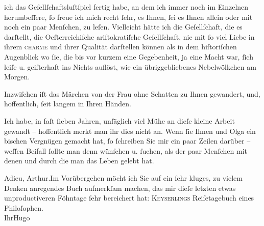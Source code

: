 \pstart
           \label{T_L02331-1v}\label{T_L02331-1}{ }{\pb}ich das Geſellſchaftsluſtſpiel fertig habe, an dem
               ich immer noch im Einzelnen herumbeſſere,{ }ſo freue ich mich recht{ }ſehr, es Ihnen,{ }ſei
               es Ihnen allein oder mit noch ein paar Menſchen, zu leſen. Vielleicht hätte ich die
               Geſellſchaft, die es darſtellt, die Oeſterreichiſche  ariſtokratiſche Geſellſchaft, nie mit{ }ſo viel Liebe in ihrem \textsc{charme} und ihrer Qualität darſtellen können als in dem
               hiſtoriſchen Augenblick wo{ }ſie, die bis vor kurzem eine Gegebenheit, ja eine Macht
               war,{ }ſich leiſe u. geiſterhaft ins Nichts auflöst, wie {\pb}ein übriggebliebenes Nebelwölkchen
               am Morgen.\pend
           
\pstart
           Inzwiſchen iſt das Märchen von der Frau ohne
                  Schatten zu Ihnen gewandert, und, hoffentlich,{ }ſeit langem in Ihren
               Händen.\pend
           
\pstart
           Ich habe, in faſt{ }ſieben Jahren, unſäglich viel Mühe an dieſe kleine Arbeit gewandt –
               hoffentlich merkt man ihr dies nicht an. Wenn{ }ſie Ihnen und Olga ein bischen Vergnügen gemacht hat,{ }ſo{ }ſchreiben Sie mir
               ein paar Zeilen darüber – weſſen Beifall{ }ſollte man denn wünſchen u.{ }ſuchen, als der
               paar Menſchen mit {\pb}denen und durch
               die man das Leben gelebt hat.\pend
           
\pstart
           Adieu, Arthur.\hspace*{1.5em}Im Vorübergehen möcht ich Sie auf ein{ }ſehr kluges, zu vielem Denken anregendes Buch aufmerkſam machen, das mir dieſe
               letzten etwas unproductiveren Föhntage{ }ſehr bereichert hat: \textsc{Keyserlings}{ }Reiſetagebuch eines
                  Philoſophen.{\\}Ihr\spacefill\mbox{Hugo}\pend
           
